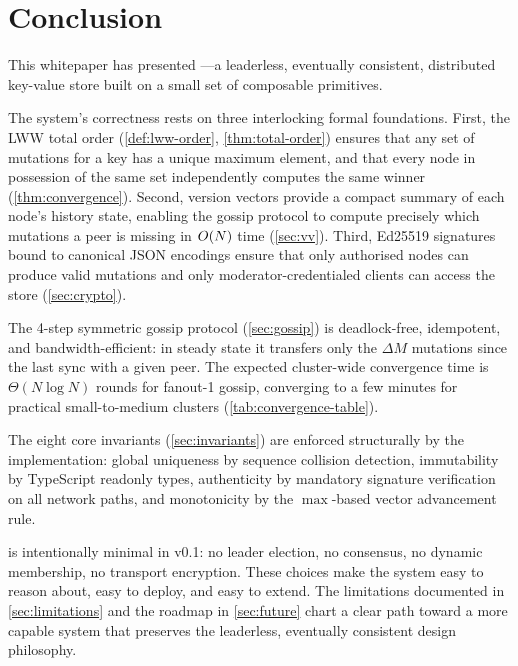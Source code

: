 \section{Conclusion}
\label{sec:conclusion}

This whitepaper has presented \pebble{}---a leaderless, eventually consistent,
distributed key-value store built on a small set of composable primitives.

The system's correctness rests on three interlocking formal foundations.
First, the LWW total order (\cref{def:lww-order}, \cref{thm:total-order})
ensures that any set of mutations for a key has a unique maximum element,
and that every node in possession of the same set independently computes the
same winner (\cref{thm:convergence}). Second, version vectors provide a
compact summary of each node's history state, enabling the gossip protocol
to compute precisely which mutations a peer is missing in $O\!\left(N\right)$ time
(\cref{sec:vv}). Third, Ed25519 signatures bound to canonical JSON encodings
ensure that only authorised nodes can produce valid mutations and only
moderator-credentialed clients can access the store (\cref{sec:crypto}).

The 4-step symmetric gossip protocol (\cref{sec:gossip}) is deadlock-free,
idempotent, and bandwidth-efficient: in steady state it transfers only the
$\Delta M$ mutations since the last sync with a given peer. The expected
cluster-wide convergence time is $\Theta(N \log N)$ rounds for fanout-1 gossip,
converging to a few minutes for practical small-to-medium clusters
(\cref{tab:convergence-table}).

The eight core invariants (\cref{sec:invariants}) are enforced structurally
by the implementation: global uniqueness by sequence collision detection,
immutability by TypeScript readonly types, authenticity by mandatory signature
verification on all network paths, and monotonicity by the $\max$-based vector
advancement rule.

\pebble{} is intentionally minimal in v0.1: no leader election, no consensus,
no dynamic membership, no transport encryption. These choices make the system
easy to reason about, easy to deploy, and easy to extend. The limitations
documented in \cref{sec:limitations} and the roadmap in \cref{sec:future}
chart a clear path toward a more capable system that preserves the leaderless,
eventually consistent design philosophy.


